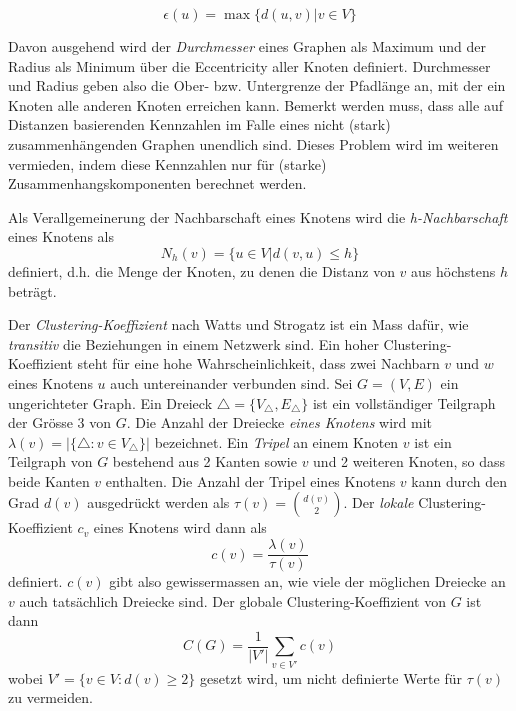 \begin{equation}
  \label{eq:3}
  \epsilon(u) = \max\{d(u,v) | v \in V\}
\end{equation}

Davon ausgehend  wird der \emph{Durchmesser} eines Graphen als Maximum
und der Radius als Minimum \"uber die Eccentricity aller Knoten
definiert. Durchmesser und Radius geben also die Ober-
bzw. Untergrenze der Pfadl\"ange an, mit der ein Knoten alle anderen
Knoten erreichen kann. Bemerkt werden muss, dass alle auf Distanzen
basierenden Kennzahlen im Falle eines nicht (stark)
zusammenh\"angenden Graphen unendlich sind. Dieses Problem wird im
weiteren vermieden, indem diese Kennzahlen nur f\"ur (starke)
Zusammenhangskomponenten berechnet werden.

Als Verallgemeinerung der Nachbarschaft eines Knotens wird die
\emph{h-Nachbarschaft} eines Knotens als
\begin{equation}
  \label{eq:4}
  N_h(v) = \{ u \in V | d(v, u) \le h \}
\end{equation}
definiert, d.h. die Menge der Knoten, zu denen die Distanz von $v$ aus
h\"ochstens $h$ betr\"agt.

Der \emph{Clustering-Koeffizient} nach Watts und Strogatz ist ein Mass
daf\"ur, wie \emph{transitiv} die Beziehungen in einem Netzwerk
sind. Ein hoher Clustering-Koeffizient steht f\"ur eine hohe
Wahrscheinlichkeit, dass zwei Nachbarn $v$ und $w$ eines Knotens $u$
auch untereinander verbunden sind. Sei $G = (V, E)$ ein ungerichteter
Graph. Ein Dreieck $\bigtriangleup = \{V_{\bigtriangleup},
E_{\bigtriangleup}\}$ ist ein vollst\"andiger Teilgraph der Gr\"osse 3
von $G$. Die Anzahl der Dreiecke \emph{eines Knotens} wird mit
$\lambda(v) = |\{\bigtriangleup : v \in V_{\bigtriangleup}\}|$
bezeichnet. Ein \emph{Tripel} an einem Knoten $v$ ist ein Teilgraph
von $G$ bestehend aus 2 Kanten sowie $v$ und 2 weiteren Knoten, so
dass beide Kanten $v$ enthalten. Die Anzahl der Tripel eines Knotens
$v$ kann durch den Grad $d(v)$ ausgedr\"uckt werden als
$\tau(v)=\binom{d(v)}{2}$. Der \emph{lokale} Clustering-Koeffizient
$c_v$ eines Knotens wird dann als
\begin{equation}
  \label{eq:5}
  c(v) = \frac{\lambda(v)}{\tau(v)}
\end{equation}
definiert. $c(v)$ gibt also gewissermassen an, wie viele der
m\"oglichen Dreiecke an $v$ auch tats\"achlich Dreiecke sind. Der
globale Clustering-Koeffizient von $G$ ist dann
\begin{equation}
  \label{eq:6}
  C(G) = \frac{1}{|V'|} \sum_{v \in V'}c(v)
\end{equation}
wobei $V' = \{v \in V : d(v) \ge 2\}$ gesetzt wird, um nicht
definierte Werte f\"ur $\tau(v)$ zu vermeiden.

